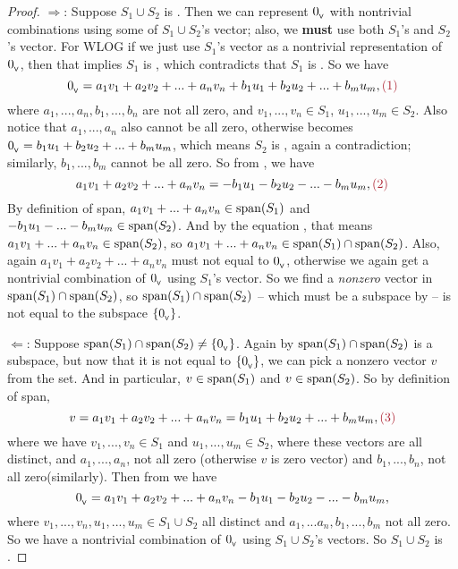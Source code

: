 \begin{proof}
\(\Longrightarrow\):
Suppose \(S_1 \cup S_2\) is \LDP{}.
Then we can represent \(0_{_{\textsf{V}}}\) with nontrivial combinations using some of \(S_1 \cup S_2\)'s vector;
also, we \textbf{must} use both \(S_1\)'s and \(S_2\)'s vector.
For WLOG if we just use \(S_1\)'s vector as a nontrivial representation of \(0_{_{\textsf{V}}}\), then that implies \(S_1\) is \LDP{}, which contradicts that \(S_1\) is \LID{}.
So we have
\[
    \OV = a_1 v_1 + a_2 v_2 + ... + a_n v_n + b_1 u_1 + b_2 u_2 + ... + b_m u_m, \MAROON{(1)}
\]
where \(a_1, ..., a_n, b_1, ..., b_n\) are not all zero, and \(v_1, ..., v_n \in S_1\), \(u_1, ..., u_m \in S_2\).
Also notice that \(a_1, ..., a_n\) also cannot be all zero, otherwise  becomes \(0_{_{\textsf{V}}} = b_1 u_1 + b_2 u_2 + ... + b_m u_m\), which means \(S_2\) is \LDP{}, again a contradiction;
similarly, \(b_1, ..., b_m\) cannot be all zero.
So from , we have
\[
    a_1 v_1 + a_2 v_2 + ... + a_n v_n = - b_1 u_1 - b_2 u_2 - ... - b_m u_m, \MAROON{(2)}
\]
By definition of span, \(a_1 v_1 + ... + a_n v_n \in \operatorname{span}(S_1)\) and \(-b_1 u_1 - ... - b_m u_m \in \operatorname{span}(S_2)\).
And by the equation , that means \(a_1 v_1 + ... + a_n v_n \in \operatorname{span}(S_2)\), so \(a_1 v_1 + ... + a_n v_n \in \operatorname{span}(S_1) \cap \operatorname{span}(S_2)\).
Also, again \(a_1 v_1 + a_2 v_2 + ... + a_n v_n\) must not equal to \(0_{_{\textsf{V}}}\), otherwise we again get a nontrivial combination of \(0_{_{\textsf{V}}}\) using \(S_1\)'s vector.
So we find a \emph{nonzero} vector in \(\operatorname{span}(S_1) \cap \operatorname{span}(S_2)\), so \(\operatorname{span}(S_1) \cap \operatorname{span}(S_2)\) -- which must be a subspace by  -- is not equal to the subspace \(\{ 0_{_{\textsf{V}}} \}\).

\(\Longleftarrow\):
Suppose \(\operatorname{span}(S_1) \cap \operatorname{span}(S_2) \ne \{ 0_{_{\textsf{V}}} \}\).
Again by  \(\operatorname{span}(S_1) \cap \operatorname{span}(S_2)\) is a subspace, but now that it is not equal to \(\{ 0_{_{\textsf{V}}} \}\), we can pick a nonzero vector \(v\) from the set.
And in particular, \(v \in \operatorname{span}(S_1)\) and \(v \in \operatorname{span}(S_2)\).
So by definition of span,
\[
    v = a_1 v_1 + a_2 v_2 + ... + a_n v_n = b_1 u_1 + b_2 u_2 + ... + b_m u_m, \MAROON{(3)}
\]
where we have \(v_1, ..., v_n \in S_1\) and \(u_1, ..., u_m \in S_2\), where these vectors are all distinct, and \(a_1, ..., a_n\), not all zero (otherwise \(v\) is zero vector) and \(b_1, ..., b_n\), not all zero(similarly).
Then from  we have
\[
    0_{_{\textsf{V}}} = a_1 v_1 + a_2 v_2 + ... + a_n v_n - b_1 u_1 - b_2 u_2 - ... - b_m u_m,
\]
where \(v_1, ..., v_n, u_1, ..., u_m \in S_1 \cup S_2\) all distinct and \(a_1, ... a_n, b_1, ..., b_m\) not all zero.
So we have a nontrivial combination of \(0_{_{\textsf{V}}}\) using \(S_1 \cup S_2\)'s vectors.
So \(S_1 \cup S_2\) is \LDP{}.
\end{proof}

